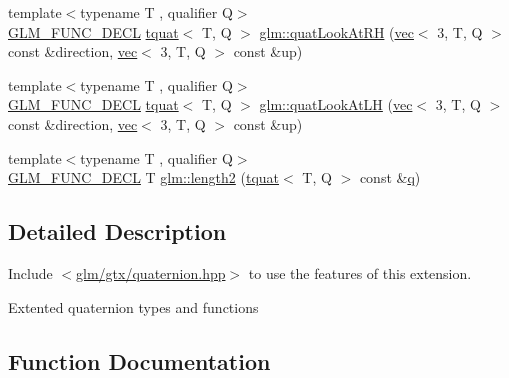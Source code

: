 \begin{DoxyCompactItemize}
\item 
{\footnotesize template$<$typename T , qualifier Q$>$ }\\\hyperlink{setup_8hpp_ab2d052de21a70539923e9bcbf6e83a51}{G\+L\+M\+\_\+\+F\+U\+N\+C\+\_\+\+D\+E\+CL} \hyperlink{structglm_1_1tquat}{tquat}$<$ T, Q $>$ \hyperlink{group__gtx__quaternion_gad30cbeb78315773b6d18d9d1c1c75b77}{glm\+::quat\+Look\+At\+RH} (\hyperlink{structglm_1_1vec}{vec}$<$ 3, T, Q $>$ const \&direction, \hyperlink{structglm_1_1vec}{vec}$<$ 3, T, Q $>$ const \&up)
\item 
{\footnotesize template$<$typename T , qualifier Q$>$ }\\\hyperlink{setup_8hpp_ab2d052de21a70539923e9bcbf6e83a51}{G\+L\+M\+\_\+\+F\+U\+N\+C\+\_\+\+D\+E\+CL} \hyperlink{structglm_1_1tquat}{tquat}$<$ T, Q $>$ \hyperlink{group__gtx__quaternion_ga6f1b3fba52fcab952d0ab523177ff443}{glm\+::quat\+Look\+At\+LH} (\hyperlink{structglm_1_1vec}{vec}$<$ 3, T, Q $>$ const \&direction, \hyperlink{structglm_1_1vec}{vec}$<$ 3, T, Q $>$ const \&up)
\item 
{\footnotesize template$<$typename T , qualifier Q$>$ }\\\hyperlink{setup_8hpp_ab2d052de21a70539923e9bcbf6e83a51}{G\+L\+M\+\_\+\+F\+U\+N\+C\+\_\+\+D\+E\+CL} T \hyperlink{group__gtx__quaternion_ga229bacc3051770b030042fe266f7b0cb}{glm\+::length2} (\hyperlink{structglm_1_1tquat}{tquat}$<$ T, Q $>$ const \&\hyperlink{_s_d_l__opengl_8h_a8fc1e7b9baaae687804c7eed46ca09c6}{q})
\end{DoxyCompactItemize}


\subsection{Detailed Description}
Include $<$\hyperlink{gtx_2quaternion_8hpp}{glm/gtx/quaternion.\+hpp}$>$ to use the features of this extension.

Extented quaternion types and functions 

\subsection{Function Documentation}
\mbox{\label{group__gtx__quaternion_ga8639615408166d0dddda1b91a940b338}} 
